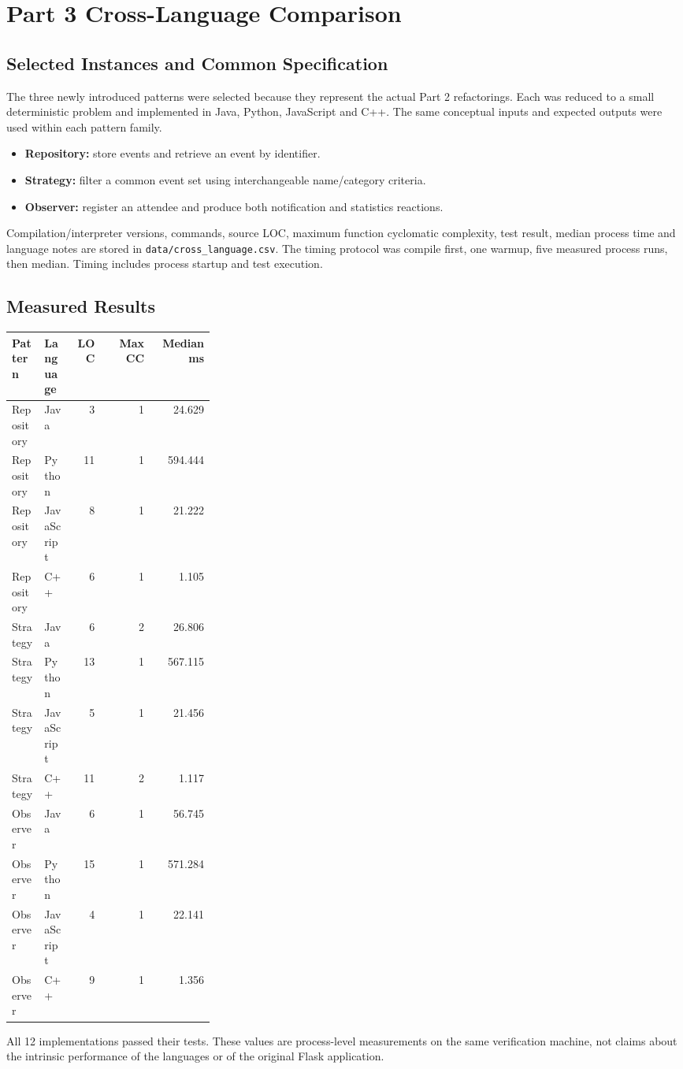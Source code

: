 \documentclass[11pt,a4paper]{article}
\begin{document}
\section{Part 3 Cross-Language Comparison}
\subsection{Selected Instances and Common Specification}
The three newly introduced patterns were selected because they represent the actual Part 2 refactorings. Each was reduced to a small deterministic problem and implemented in Java, Python, JavaScript and C++. The same conceptual inputs and expected outputs were used within each pattern family.

\begin{itemize}
\item \textbf{Repository:} store events and retrieve an event by identifier.
\item \textbf{Strategy:} filter a common event set using interchangeable name/category criteria.
\item \textbf{Observer:} register an attendee and produce both notification and statistics reactions.
\end{itemize}

Compilation/interpreter versions, commands, source LOC, maximum function cyclomatic complexity, test result, median process time and language notes are stored in \texttt{data/cross\_language.csv}. The timing protocol was compile first, one warmup, five measured process runs, then median. Timing includes process startup and test execution.

\subsection{Measured Results}
\begin{longtable}{p{0.16\linewidth}p{0.14\linewidth}r r r}
\toprule
Pattern & Language & LOC & Max CC & Median ms\\
\midrule
Repository & Java & 3 & 1 & 24.629\\
Repository & Python & 11 & 1 & 594.444\\
Repository & JavaScript & 8 & 1 & 21.222\\
Repository & C++ & 6 & 1 & 1.105\\
Strategy & Java & 6 & 2 & 26.806\\
Strategy & Python & 13 & 1 & 567.115\\
Strategy & JavaScript & 5 & 1 & 21.456\\
Strategy & C++ & 11 & 2 & 1.117\\
Observer & Java & 6 & 1 & 56.745\\
Observer & Python & 15 & 1 & 571.284\\
Observer & JavaScript & 4 & 1 & 22.141\\
Observer & C++ & 9 & 1 & 1.356\\
\bottomrule
\end{longtable}
All 12 implementations passed their tests. These values are process-level measurements on the same verification machine, not claims about the intrinsic performance of the languages or of the original Flask application.
\end{document}
